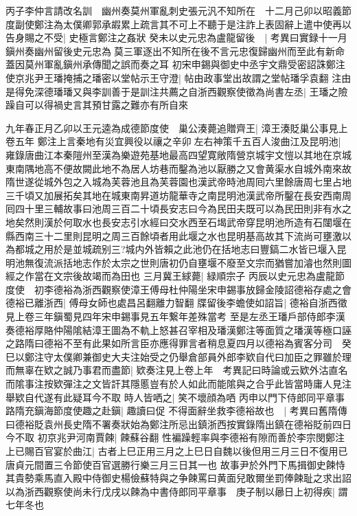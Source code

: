 丙子李仲言請改名訓　幽州奏莫州軍亂刺史張元汎不知所在　十二月己卯以昭義節度副使鄭注為太僕卿郭承嘏累上疏言其不可上不聽于是注詐上表固辭上遣中使再以告身賜之不受|{
	史極言鄭注之姦狀}
癸未以史元忠為盧龍留後　|{
	考異曰實録十一月鎭州奏幽州留後史元忠為莫三軍逐出不知所在後不言元忠復歸幽州而至此有新命蓋因莫州軍亂鎭州承傳聞之誤而奏之耳}
初宋申錫與御史中丞宇文鼎受密詔誅鄭注使京兆尹王璠掩捕之璠密以堂帖示王守澄|{
	帖由政事堂出故謂之堂帖璠孚袁翻}
注由是得免深德璠璠又與李訓善于是訓注共薦之自浙西觀察使徵為尚書左丞|{
	王璠之險躁自可以得禍史言其預甘露之難亦有所自來}


九年春正月乙卯以王元逵為成德節度使　巢公湊薨追贈齊王|{
	漳王湊貶巢公事見上卷五年}
鄭注上言秦地有災宜興役以禳之辛卯左右神策千五百人浚曲江及昆明池|{
	雍錄唐曲江本秦隑州至漢為樂遊苑基地最高四望寛敞隋營京城宇文愷以其地在京城東南隅地高不便故闕此地不為居人坊巷而鑿為池以厭勝之又會黄渠水自城外南來故隋世遂從城外包之入城為芙蓉池且為芙蓉園也漢武帝時池周囘六里餘唐周七里占地三千頃又加展拓矣其地在城東南昇道坊龍華寺之南昆明池漢武帝所鑿在長安西南周囘四十里三輔故事曰池周三百二十頃長安志曰今為民田夫既可以為民田則非有水之地矣然則漢於何取水也長安志引水經曰交水西至石堨武帝穿昆明池所造有石闥堰在縣西南三十二里則昆明之周三百餘頃者用此堰之水也昆明基高故其下流尚可壅激以為都城之用於是並城疏别三?城内外皆賴之此池仍在括地志曰豐鎬二水皆已堰入昆明池無復流派括地志作於太宗之世則唐初仍自壅堰不廢至文宗而猶嘗加濬也然則圖經之作當在文宗後故竭而為田也}
三月冀王絿薨|{
	緑順宗子}
丙辰以史元忠為盧龍節度使　初李德裕為浙西觀察使漳王傅母杜仲陽坐宋申錫事放歸金陵詔德裕存處之會德裕已離浙西|{
	傅母女師也處昌呂翻離力智翻}
牒留後李蟾使如詔旨|{
	德裕自浙西徵見上卷三年鎭蜀見四年宋申錫事見五年繋年差殊當考}
至是左丞王璠戶部侍郎李漢奏德裕厚賂仲陽隂結漳王圖為不軌上怒甚召宰相及璠漢鄭注等面質之璠漢等極口誣之路隋曰德裕不至有此果如所言臣亦應得罪言者稍息夏四月以德裕為賓客分司　癸巳以鄭注守太僕卿兼御史大夫注始受之仍舉倉部員外郎李欵自代曰加臣之罪雖於理而無辜在欵之誠乃事君而盡節|{
	欵奏注見上卷上年　考異記曰時論或云欵外沽直名而隂事注按欵彈注之文皆訐其隱慝豈有於人如此而能隂與之合乎此皆當時庸人見注舉欵自代遂有此疑耳今不取}
時人皆哂之|{
	笑不壞顔為哂}
丙申以門下侍郎同平章事路隋充鎭海節度使趣之赴鎭|{
	趣讀曰促}
不得面辭坐救李德裕故也　|{
	考異曰舊隋傳曰德裕貶袁州長史隋不署奏狀始為鄭注所忌出鎮浙西按實錄隋出鎮在德裕貶前四日今不取}
初京兆尹河南賈餗|{
	餗蘇谷翻}
性褊躁輕率與李德裕有隙而善於李宗閔鄭注上已賜百官宴於曲江|{
	古者上巳正用三月之上巳日自魏以後但用三月三日不復用已唐貞元間置三令節使百官選勝行樂三月三日其一也}
故事尹於外門下馬揖御史餗恃其貴勢乘馬直入殿中侍御史楊儉蘇特與之争餗罵曰黄面兒敢爾坐罰俸餗耻之求出詔以為浙西觀察使尚未行戊戌以餗為中書侍郎同平章事　庚子制以曏日上初得疾|{
	謂七年冬也}
